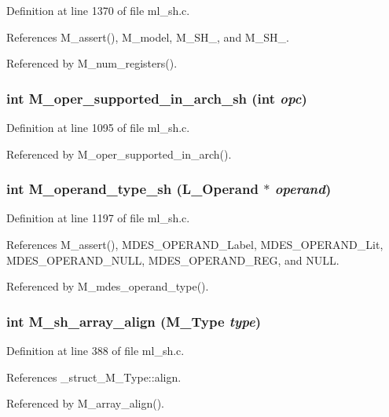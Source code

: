 Definition at line 1370 of file ml\_\-sh.c.

References M\_\-assert(), M\_\-model, M\_\-SH\_, and M\_\-SH\_.

Referenced by M\_\-num\_\-registers().
\subsubsection{\setlength{\rightskip}{0pt plus 5cm}int M\_\-oper\_\-supported\_\-in\_\-arch\_\-sh (int {\em opc})}\label{ml__sh_8c_bd9c30adefdfc96784dd6c7f33cb1385}




Definition at line 1095 of file ml\_\-sh.c.

Referenced by M\_\-oper\_\-supported\_\-in\_\-arch().
\subsubsection{\setlength{\rightskip}{0pt plus 5cm}int M\_\-operand\_\-type\_\-sh (L\_\-Operand $\ast$ {\em operand})}\label{ml__sh_8c_aa248ce48a1eb7004120fbee41ce7943}




Definition at line 1197 of file ml\_\-sh.c.

References M\_\-assert(), MDES\_\-OPERAND\_\-Label, MDES\_\-OPERAND\_\-Lit, MDES\_\-OPERAND\_\-NULL, MDES\_\-OPERAND\_\-REG, and NULL.

Referenced by M\_\-mdes\_\-operand\_\-type().
\subsubsection{\setlength{\rightskip}{0pt plus 5cm}int M\_\-sh\_\-array\_\-align (\bf{M\_\-Type} {\em type})}\label{ml__sh_8c_39abd95c38c7c922d1032828df4eca7c}




Definition at line 388 of file ml\_\-sh.c.

References \_\-struct\_\-M\_\-Type::align.

Referenced by M\_\-array\_\-align().
